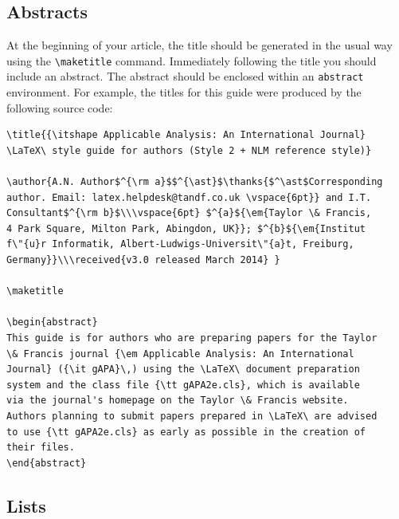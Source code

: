 \documentclass{gAPA2e}
\theoremstyle{plain}
\theoremstyle{remark}
\theoremstyle{definition}
\begin{document}
\subsection{Abstracts}

At the beginning of your article, the title should be generated in the usual way using the {\verb"\maketitle"}
command. Immediately following the title you should include an abstract. The abstract should be enclosed within
an {\tt abstract} environment. For example, the titles for this guide were produced by the following source code:
%
\begin{verbatim}
\title{{\itshape Applicable Analysis: An International Journal} 
\LaTeX\ style guide for authors (Style 2 + NLM reference style)}

\author{A.N. Author$^{\rm a}$$^{\ast}$\thanks{$^\ast$Corresponding
author. Email: latex.helpdesk@tandf.co.uk \vspace{6pt}} and I.T.
Consultant$^{\rm b}$\\\vspace{6pt} $^{a}${\em{Taylor \& Francis,
4 Park Square, Milton Park, Abingdon, UK}}; $^{b}${\em{Institut
f\"{u}r Informatik, Albert-Ludwigs-Universit\"{a}t, Freiburg,
Germany}}\\\received{v3.0 released March 2014} }

\maketitle

\begin{abstract}
This guide is for authors who are preparing papers for the Taylor
\& Francis journal {\em Applicable Analysis: An International 
Journal} ({\it gAPA}\,) using the \LaTeX\ document preparation 
system and the class file {\tt gAPA2e.cls}, which is available 
via the journal's homepage on the Taylor \& Francis website. 
Authors planning to submit papers prepared in \LaTeX\ are advised 
to use {\tt gAPA2e.cls} as early as possible in the creation of 
their files.
\end{abstract}
\end{verbatim}


\subsection{Lists}
\end{document}
